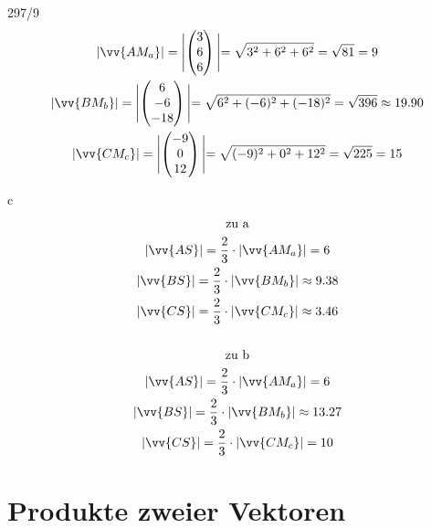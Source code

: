 \begin{exercise}{297/9}
\begin{gather*}
    |\vv{AM_a}| = \Biggl|\begin{pmatrix}3 \\ 6 \\ 6\end{pmatrix}\Biggl| = \sqrt{3^2 + 6^2 + 6^2} = \sqrt{81} = 9 \\
    |\vv{BM_b}| = \Biggl|\begin{pmatrix}6 \\ -6 \\ -18\end{pmatrix}\Biggl| = \sqrt{6^2 + (-6)^2 + (-18)^2} = \sqrt{396} \approx 19.90 \\
    |\vv{CM_c}| = \Biggl|\begin{pmatrix}-9 \\ 0 \\ 12\end{pmatrix}\Biggl| = \sqrt{(-9)^2 + 0^2 + 12^2} = \sqrt{225} = 15
  \end{gather*}
  \item [c]
  \begin{gather*}
    \text{zu a} \\
    |\vv{AS}| = \frac{2}{3} \cdot |\vv{AM_a}| = 6 \\
    |\vv{BS}| = \frac{2}{3} \cdot |\vv{BM_b}| \approx 9.38 \\
    |\vv{CS}| = \frac{2}{3} \cdot |\vv{CM_c}| \approx 3.46 \\\\
    \text{zu b} \\
    |\vv{AS}| = \frac{2}{3} \cdot |\vv{AM_a}| = 6 \\
    |\vv{BS}| = \frac{2}{3} \cdot |\vv{BM_b}| \approx 13.27 \\
    |\vv{CS}| = \frac{2}{3} \cdot |\vv{CM_c}| = 10
  \end{gather*}
\end{exercise}
\section{Produkte zweier Vektoren}
